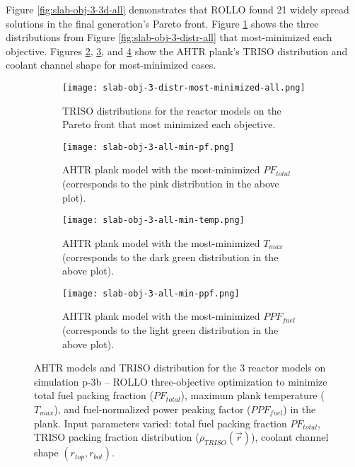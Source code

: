Figure \ref{fig:slab-obj-3-3d-all} demonstrates that \gls{ROLLO} found 21 widely spread 
solutions in the final generation's Pareto front. 
Figure \ref{fig:slab-obj-3-distr-most-minimized-distr-all} shows the three distributions 
from Figure \ref{fig:slab-obj-3-distr-all} that most-minimized each objective. 
Figures \ref{fig:slab-obj-3-all-min-pf}, \ref{fig:slab-obj-3-all-min-temp}, and 
\ref{fig:slab-obj-3-all-min-ppf} show the \gls{AHTR} plank's TRISO distribution and 
coolant channel shape for most-minimized cases. 
\begin{figure}[htbp!]
    \begin{subfigure}{\textwidth}
        \texttt{[image: slab-obj-3-distr-most-minimized-all.png]}
        \caption{TRISO distributions for the reactor models on the Pareto 
        front that most minimized each objective.}
        \label{fig:slab-obj-3-distr-most-minimized-distr-all}
    \end{subfigure}
    \begin{subfigure}{\textwidth}
        \texttt{[image: slab-obj-3-all-min-pf.png]}
        \caption{\gls{AHTR} plank model with the most-minimized $PF_{total}$
        (corresponds to the pink distribution in the above plot).}
        \label{fig:slab-obj-3-all-min-pf}
    \end{subfigure}
    \begin{subfigure}{\textwidth}
        \texttt{[image: slab-obj-3-all-min-temp.png]}
        \caption{\gls{AHTR} plank model with the most-minimized $T_{max}$
        (corresponds to the dark green distribution in the above plot).}
        \label{fig:slab-obj-3-all-min-temp}
    \end{subfigure}
    \begin{subfigure}{\textwidth}
        \texttt{[image: slab-obj-3-all-min-ppf.png]}
        \caption{\gls{AHTR} plank model with the most-minimized $PPF_{fuel}$
        (corresponds to the light green distribution in the above plot).}
        \label{fig:slab-obj-3-all-min-ppf}
    \end{subfigure}
    \caption{AHTR models and TRISO distribution for the 3 reactor models on simulation 
    p-3b -- ROLLO three-objective optimization to minimize total 
    fuel packing fraction ($PF_{total}$), maximum plank temperature ($T_{max}$), and 
    fuel-normalized power peaking factor ($PPF_{fuel}$) in the plank. 
    Input parameters varied: total fuel packing fraction $PF_{total}$, 
    TRISO packing fraction distribution ($\rho_{TRISO}(\vec{r})$), 
    coolant channel shape $(r_{top}, r_{bot})$.}
    \label{fig:slab-obj-3-distr-most-minimized-all}
\end{figure}

